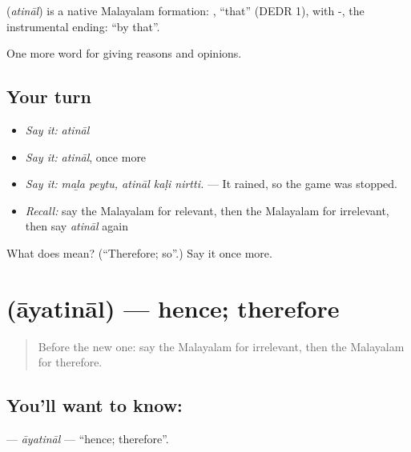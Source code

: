 \begin{cousinweb}
\textbf{} (\emph{atināl}) is a native Malayalam formation: , \textquotedblleft{}that\textquotedblright{} (DEDR 1), with -, the instrumental ending: \textquotedblleft{}by that\textquotedblright{}.
\end{cousinweb}

\begin{grammarlens}[title={What you've built}]
One more word for giving reasons and opinions.
\end{grammarlens}

\subsection*{Your turn}
\begin{itemize}
\raggedright
  \item \emph{Say it:} \emph{atināl}
  \item \emph{Say it:} \emph{atināl}, once more
  \item \emph{Say it:} \emph{maḻa peytu, atināl kaḷi nirtti.} — It rained, so the game was stopped.
  \item \emph{Recall:} say the Malayalam for relevant, then the Malayalam for irrelevant, then say \emph{atināl} again
\end{itemize}

\begin{tcolorbox}[breakable,colback=teal!4,colframe=teal!35!black,title={Before you move on}]
What does  mean? (\textquotedblleft{}Therefore; so\textquotedblright{}.) Say it once more.
\end{tcolorbox}
\section[\texorpdfstring{\ml{ആയതിനാൽ} (āyatināl)}{ആയതിനാൽ (āyatināl)}]{ (āyatināl) — hence; therefore}

\label{lesson:ML-C411-ayatinal}



\begin{quote}
Before the new one: say the Malayalam for irrelevant, then the Malayalam for therefore.
\end{quote}

\subsection*{You'll want to know: }
\textbf{} — \emph{āyatināl} — \textquotedblleft{}hence; therefore\textquotedblright{}.

